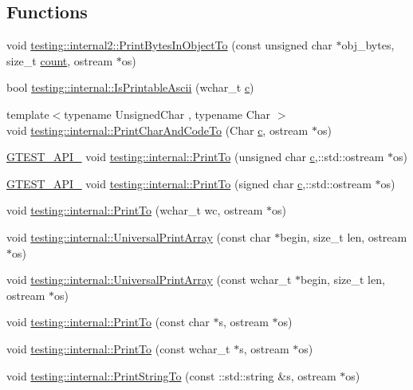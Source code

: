\subsection*{Functions}
\begin{DoxyCompactItemize}
\item 
void \hyperlink{namespacetesting_1_1internal2_abfb9aa80365f93b952e9a4bea09947a8}{testing\+::internal2\+::\+Print\+Bytes\+In\+Object\+To} (const unsigned char $\ast$obj\+\_\+bytes, size\+\_\+t \hyperlink{gmock__stress__test_8cc_afd9db40e3361ae09188795e8cbe19752}{count}, ostream $\ast$os)
\item 
bool \hyperlink{namespacetesting_1_1internal_a744a6dd74c12d1e2c16b3c03e14ed4d4}{testing\+::internal\+::\+Is\+Printable\+Ascii} (wchar\+\_\+t \hyperlink{jquery_8js_abce695e0af988ece0826d9ad59b8160d}{c})
\item 
{\footnotesize template$<$typename Unsigned\+Char , typename Char $>$ }\\void \hyperlink{namespacetesting_1_1internal_a0c577e598e61d339ba45dd6643fb1969}{testing\+::internal\+::\+Print\+Char\+And\+Code\+To} (Char \hyperlink{jquery_8js_abce695e0af988ece0826d9ad59b8160d}{c}, ostream $\ast$os)
\item 
\hyperlink{gtest-port_8h_aa73be6f0ba4a7456180a94904ce17790}{G\+T\+E\+S\+T\+\_\+\+A\+P\+I\+\_\+} void \hyperlink{namespacetesting_1_1internal_abae1a8d465376b68576918205ad706a9}{testing\+::internal\+::\+Print\+To} (unsigned char \hyperlink{jquery_8js_abce695e0af988ece0826d9ad59b8160d}{c},\+::std\+::ostream $\ast$os)
\item 
\hyperlink{gtest-port_8h_aa73be6f0ba4a7456180a94904ce17790}{G\+T\+E\+S\+T\+\_\+\+A\+P\+I\+\_\+} void \hyperlink{namespacetesting_1_1internal_a09f551128c4d165c37004e36ccc87aa0}{testing\+::internal\+::\+Print\+To} (signed char \hyperlink{jquery_8js_abce695e0af988ece0826d9ad59b8160d}{c},\+::std\+::ostream $\ast$os)
\item 
void \hyperlink{namespacetesting_1_1internal_aa74ea9d64f76ce69eceb225ca5ebef58}{testing\+::internal\+::\+Print\+To} (wchar\+\_\+t wc, ostream $\ast$os)
\item 
void \hyperlink{namespacetesting_1_1internal_a070107e7a8205ad6ec4d538d52b15b38}{testing\+::internal\+::\+Universal\+Print\+Array} (const char $\ast$begin, size\+\_\+t len, ostream $\ast$os)
\item 
void \hyperlink{namespacetesting_1_1internal_a52394019018eb5079f9f1bcca23dcd60}{testing\+::internal\+::\+Universal\+Print\+Array} (const wchar\+\_\+t $\ast$begin, size\+\_\+t len, ostream $\ast$os)
\item 
void \hyperlink{namespacetesting_1_1internal_adc6c98306d40b53fd07be4e295102a0a}{testing\+::internal\+::\+Print\+To} (const char $\ast$s, ostream $\ast$os)
\item 
void \hyperlink{namespacetesting_1_1internal_afc20fb56b2547a8f91f9ff99650f2024}{testing\+::internal\+::\+Print\+To} (const wchar\+\_\+t $\ast$s, ostream $\ast$os)
\item 
void \hyperlink{namespacetesting_1_1internal_ad609167d8d6792b0fb186539e0e159bd}{testing\+::internal\+::\+Print\+String\+To} (const \+::std\+::string \&s, ostream $\ast$os)
\end{DoxyCompactItemize}
